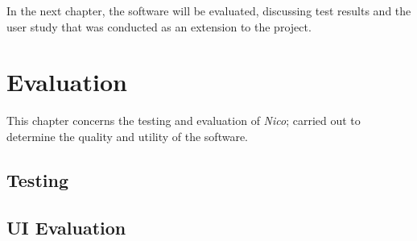 \documentclass[12pt,twoside,notitlepage,xetex]{report}
\begin{document}
In the next chapter, the software will be evaluated, discussing test results and the user study that was conducted as an extension to the project.

\cleardoublepage
\chapter{Evaluation}

This chapter concerns the testing and evaluation of \emph{Nico}; carried out to determine the quality and utility of the software.

\section{Testing}%


\section{UI Evaluation}
\end{document}
